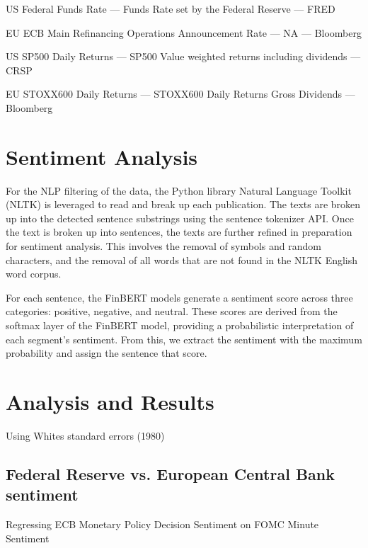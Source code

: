 \documentclass [12pt]{article}
\begin{document}
US Federal Funds Rate — Funds Rate set by the Federal Reserve — FRED

EU ECB Main Refinancing Operations Announcement Rate — NA — Bloomberg

US SP500 Daily Returns — SP500 Value weighted returns including dividends — CRSP\cite{CSPR}

EU STOXX600 Daily Returns — STOXX600 Daily Returns Gross Dividends — Bloomberg

\section{Sentiment Analysis}
For the NLP filtering of the data, the Python library Natural Language Toolkit (NLTK)\cite{NLTK} is leveraged to read and break up each publication. The texts are broken up into the detected sentence substrings using the sentence tokenizer API. Once the text is broken up into sentences, the texts are further refined in preparation for sentiment analysis. This involves the removal of symbols and random characters, and the removal of all words that are not found in the NLTK English word corpus.  

For each sentence, the FinBERT models generate a sentiment score across three categories: positive, negative, and neutral. These scores are derived from the softmax layer of the FinBERT model, providing a probabilistic interpretation of each segment's sentiment. From this, we extract the sentiment with the maximum probability and assign the sentence that score.

\section{Analysis and Results}

Using Whites standard errors (1980) \cite{White1980}

\subsection{Federal Reserve vs. European Central Bank sentiment}



Regressing ECB Monetary Policy Decision Sentiment on FOMC Minute Sentiment
\end{document}
